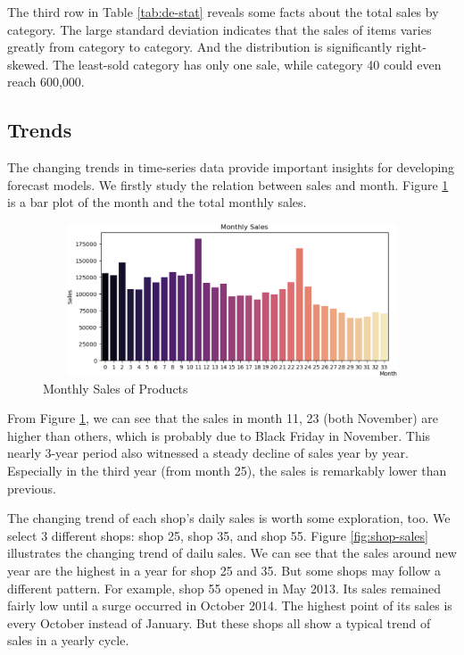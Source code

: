 \documentclass{article}
\begin{document}
The third row in Table \ref{tab:de-stat} reveals some facts about the total sales by category. The large standard deviation indicates that the sales of items varies greatly from category to category. And the distribution is significantly right-skewed. The least-sold category has only one sale, while category 40 could even reach 600,000.


\subsection{Trends}
The changing trends in time-series data provide important insights for developing forecast models. We firstly study the relation between sales and month. Figure \ref{fig:month-sales} is a bar plot of the month and the total monthly sales.

\begin{figure}[!ht]
    \centering
    \includegraphics[width=12cm, height=4.5cm]{./figs/month-sales.png}
    \caption{Monthly Sales of Products}
    \label{fig:month-sales}
\end{figure}

From Figure \ref{fig:month-sales}, we can see that the sales in month 11, 23 (both November) are higher than others, which is probably due to Black Friday in November. This nearly 3-year period also witnessed a steady decline of sales year by year. Especially in the third year (from month 25), the sales is remarkably lower than previous.\par

The changing trend of each shop's daily sales is worth some exploration, too. We select 3 different shops: shop 25, shop 35, and shop 55. Figure \ref{fig:shop-sales} illustrates the changing trend of dailu sales. We can see that the sales around new year are the highest in a year for shop 25 and 35. But some shops may follow a different pattern. For example, shop 55 opened in May 2013. Its sales remained fairly low until a surge occurred in October 2014. The highest point of its sales is every October instead of January. But these shops all show a typical trend of sales in a yearly cycle.
\end{document}
